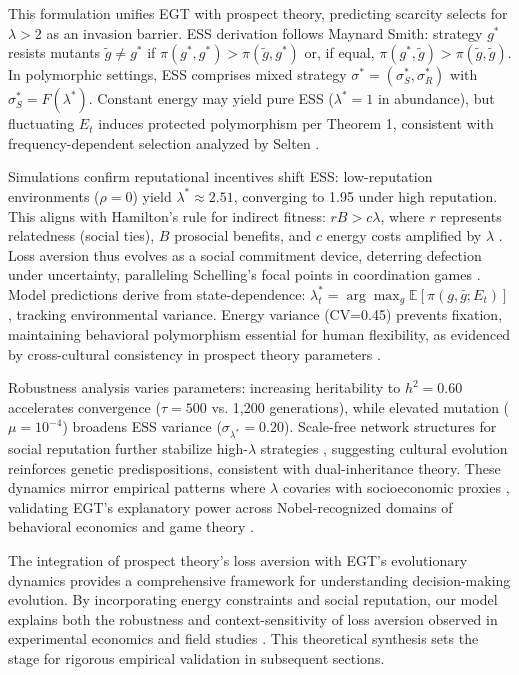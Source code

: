 \documentclass[11pt,twocolumn]{article}
\begin{document}
This formulation unifies EGT with prospect theory, predicting scarcity selects for $\lambda > 2$ as an invasion barrier. ESS derivation follows Maynard Smith: strategy $g^*$ resists mutants $\tilde{g} \neq g^*$ if $\pi(g^*, g^*) > \pi(\tilde{g}, g^*)$ or, if equal, $\pi(g^*, \tilde{g}) > \pi(\tilde{g}, \tilde{g})$. In polymorphic settings, ESS comprises mixed strategy $\sigma^* = (\sigma_S^*, \sigma_R^*)$ with $\sigma_S^* = F(\lambda^*)$. Constant energy may yield pure ESS ($\lambda^*=1$ in abundance), but fluctuating $E_t$ induces protected polymorphism per Theorem 1, consistent with frequency-dependent selection analyzed by Selten \citep{selten1975}.

Simulations confirm reputational incentives shift ESS: low-reputation environments ($\rho=0$) yield $\lambda^* \approx 2.51$, converging to 1.95 under high reputation. This aligns with Hamilton's rule for indirect fitness: $r B > c \lambda$, where $r$ represents relatedness (social ties), $B$ prosocial benefits, and $c$ energy costs amplified by $\lambda$ \citep{hamilton1964}. Loss aversion thus evolves as a social commitment device, deterring defection under uncertainty, paralleling Schelling's focal points in coordination games \citep{schelling1960}. Model predictions derive from state-dependence: $\lambda_t^* = \arg\max_g \mathbb{E}[\pi(g, \bar{g}; E_t)]$, tracking environmental variance. Energy variance (CV=0.45) prevents fixation, maintaining behavioral polymorphism essential for human flexibility, as evidenced by cross-cultural consistency in prospect theory parameters \citep{ruggeri2020}.

Robustness analysis varies parameters: increasing heritability to $h^2=0.60$ accelerates convergence ($\tau=500$ vs. 1,200 generations), while elevated mutation ($\mu=10^{-4}$) broadens ESS variance ($\sigma_{\lambda^*}=0.20$). Scale-free network structures for social reputation further stabilize high-$\lambda$ strategies \citep{nowak2006}, suggesting cultural evolution reinforces genetic predispositions, consistent with dual-inheritance theory. These dynamics mirror empirical patterns where $\lambda$ covaries with socioeconomic proxies \citep{mani2013}, validating EGT's explanatory power across Nobel-recognized domains of behavioral economics \citep{kahneman2011} and game theory \citep{aumann2003}.

The integration of prospect theory's loss aversion \citep{kahneman1979} with EGT's evolutionary dynamics provides a comprehensive framework for understanding decision-making evolution. By incorporating energy constraints and social reputation, our model explains both the robustness and context-sensitivity of loss aversion observed in experimental economics \citep{smith2000} and field studies \citep{mani2013}. This theoretical synthesis sets the stage for rigorous empirical validation in subsequent sections.
\end{document}
